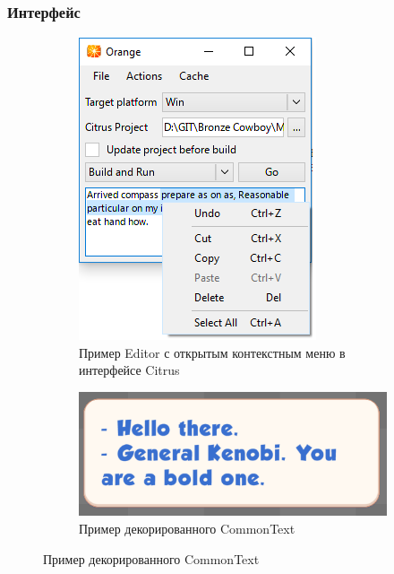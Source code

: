\documentclass[10pt, unicode]{beamer}
\begin{document}
    \begin{frame}
        \frametitle{Интерфейс}
        \begin{figure}[h]
            \centering
            \begin{subfigure}[h]{0.49\textwidth}
                \includegraphics[width=\textwidth]{images/EditorContextMenu.png}
                \caption{Пример Editor с открытым контекстным меню в интерфейсе Citrus}
            \end{subfigure}
            \begin{subfigure}[h]{0.49\textwidth}
                \includegraphics[width=\textwidth]{images/DecoratedBubble.png}
                \caption{Пример декорированного CommonText}
            \end{subfigure}
        \end{figure}
    \end{frame}
\end{document}
